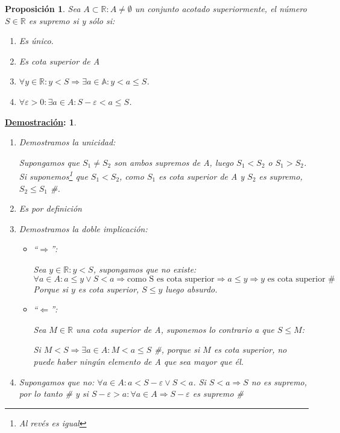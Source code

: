 \documentclass[10pt,a4paper,openright]{book}
\theoremstyle{break}
\newtheorem*{prop}{Proposición}
\newtheorem*{demo}{\underline{Demostración}:}
\begin{document}
\begin{prop}
Sea $A\subset \mathbb R: A\neq \emptyset$ un conjunto acotado superiormente, el número $S\in \mathbb R$ es supremo si y sólo si:
\begin{enumerate}
\item Es único.
\item Es cota superior de A
\item $\forall y\in \mathbb R: y<S\Rightarrow \exists a\in \mathbb A: y<a\leq S$.
\item $\forall \varepsilon>0: \exists a\in A: S- \varepsilon <a\leq S$.
\end{enumerate}
\end{prop}
\begin{demo}
\begin{enumerate}
\item Demostramos la unicidad:\par
Supongamos que $S_1\neq S_2$ son ambos supremos de A, luego $S_1<S_2$ o $S_1>S_2$. Si suponemos\footnote{Al revés es igual} que $S_1<S_2$, como $S_1$ es cota superior de A y $S_2$ es supremo, $S_2\leq S_1$ \#.

\item Es por definición

\item Demostramos la doble implicación:
	\begin{itemize}
	\item ``$\Rightarrow$'':\par
	Sea $y\in \mathbb R: y<S$, supongamos que no existe:
	$$\forall a \in A: a\leq y \vee S<a\Rightarrow \mbox{como S es cota superior}\Rightarrow a\leq y\Rightarrow y \mbox{ es cota superior \#}$$
	Porque si $y$ es cota superior, $S\leq y$ luego absurdo.
	
	\item ``$\Leftarrow$'':\par
	Sea $M\in \mathbb R$ una cota superior de A, suponemos lo contrario a que $S\leq M$:\par
	Si $M<S\Rightarrow \exists a\in A: M<a\leq S$ \#, porque si $M$ es cota superior, no puede haber ningún elemento de A que sea mayor que él.
	\end{itemize}
	
\item Supongamos que no: $\forall a \in A: a<S-\varepsilon \vee S< a$. Si $S<a\Rightarrow S$ no es supremo, por lo tanto \# y si $S-\varepsilon> a: \forall a \in A\Rightarrow S-\varepsilon$ es supremo \#
\end{enumerate}
\end{demo}
\end{document}
